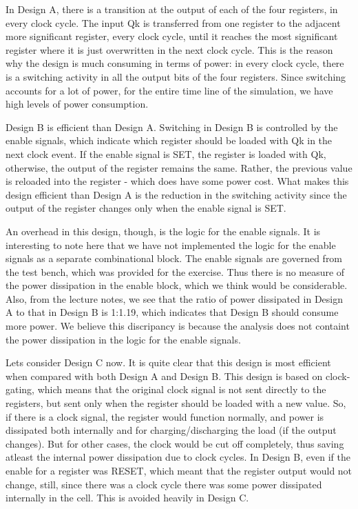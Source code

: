 \documentclass[11pt,a4paper]{article}
\begin{document}
In Design A, there is a transition at the output of each of the four registers, in every clock cycle. The input Qk is transferred from one register to the adjacent more significant register, every clock cycle, until it reaches the most significant register where it is just overwritten in the next clock cycle. This is the reason why the design is much consuming in terms of power: in every clock cycle, there is a switching activity in all the output bits of the four registers. Since switching accounts for a lot of power, for the entire time line of the simulation, we have high levels of power consumption. 

Design B is efficient than Design A. Switching in Design B is controlled by the enable signals, which indicate which register should be loaded with Qk in the next clock event. If the enable signal is SET, the register is loaded with Qk, otherwise, the output of the register remains the same. Rather, the previous value is reloaded into the register - which does have some power cost. What makes this design efficient than Design A is the reduction in the switching activity since the output of the register changes only when the enable signal is SET.

An overhead in this design, though, is the logic for the enable signals. It is interesting to note here that we have not implemented the logic for the enable signals as a separate combinational block. The enable signals are governed from the test bench, which was provided for the exercise. Thus there is no measure of the power dissipation in the enable block, which we think would be considerable. Also, from the lecture notes, we see that the ratio of power dissipated in Design A to that in Design B is 1:1.19, which indicates that Design B should consume more power. We believe this discripancy is because the analysis does not containt the power dissipation in the logic for the enable signals.

Lets consider Design C now. It is quite clear that this design is most efficient when compared with both Design A and Design B. This design is based on clock-gating, which means that the original clock signal is not sent directly to the registers, but sent only when the register should be loaded with a new value. So, if there is a clock signal, the register would function normally, and power is dissipated both internally and for charging/discharging the load (if the output changes). But for other cases, the clock would be cut off completely, thus saving atleast the internal power dissipation due to clock cycles. In Design B, even if the enable for a register was RESET, which meant that the register output would not change, still, since there was a clock cycle there was some power dissipated internally in the cell. This is avoided heavily in Design C.
\end{document}
